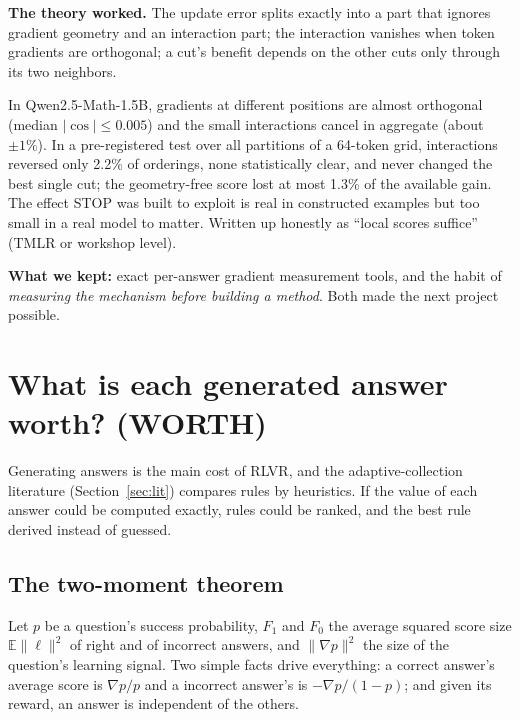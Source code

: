 \documentclass[11pt]{article}
\newcommand{\E}{\mathbb{E}}
\begin{document}
\textbf{The theory worked.} The update error splits exactly into a part that ignores gradient geometry and an interaction part; the interaction vanishes when token gradients are orthogonal; a cut's benefit depends on the other cuts only through its two neighbors.

\begin{found}
In Qwen2.5-Math-1.5B, gradients at different positions are almost orthogonal (median $|\cos|\le0.005$) and the small interactions cancel in aggregate (about $\pm1\%$). In a pre-registered test over all partitions of a 64-token grid, interactions reversed only 2.2\% of orderings, none statistically clear, and never changed the best single cut; the geometry-free score lost at most 1.3\% of the available gain. The effect STOP was built to exploit is real in constructed examples but too small in a real model to matter. Written up honestly as ``local scores suffice'' (TMLR or workshop level).
\end{found}

\textbf{What we kept:} exact per-answer gradient measurement tools, and the habit of \emph{measuring the mechanism before building a method}. Both made the next project possible.

\section{What is each generated answer worth? (WORTH)}\label{sec:worth}

\begin{why}
Generating answers is the main cost of RLVR, and the adaptive-collection literature (Section~\ref{sec:lit}) compares rules by heuristics. If the value of each answer could be computed exactly, rules could be ranked, and the best rule derived instead of guessed.
\end{why}

\subsection{The two-moment theorem}
Let $p$ be a question's success probability, $F_1$ and $F_0$ the average squared score size $\E\|\ell\|^2$ of right and of incorrect answers, and $\|\nabla p\|^2$ the size of the question's learning signal. Two simple facts drive everything: a correct answer's average score is $\nabla p/p$ and a incorrect answer's is $-\nabla p/(1-p)$; and given its reward, an answer is independent of the others.
\end{document}
